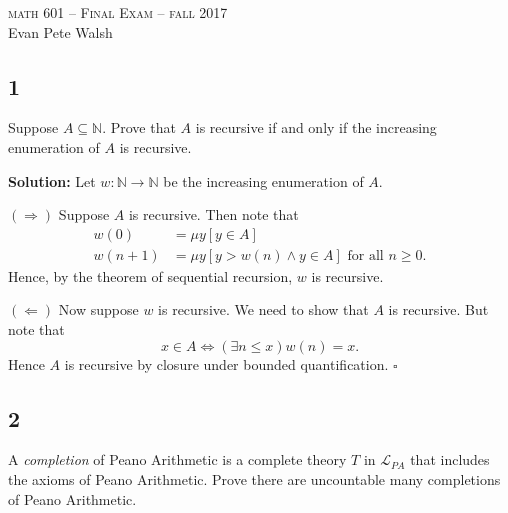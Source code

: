 \documentclass[12pt]{article}
\newcounter{ProofCounter}
\newenvironment{Solution}{\stepcounter{ProofCounter}\textbf{Solution:}}{\hfill$\square$}
\begin{document}
\thispagestyle{empty}
\begin{center}
  \Large \textsc{math 601 -- Final Exam -- fall 2017} \\ 
  \vspace{5mm}
  \large Evan Pete Walsh
\end{center}

\subsection*{1}
\begin{tcolorbox}
  Suppose $A \subseteq \mathbb{N}$. Prove that $A$ is recursive if and only if the increasing enumeration of $A$ is recursive.
\end{tcolorbox}

\begin{Solution}
  Let $w : \mathbb{N} \rightarrow \mathbb{N}$ be the increasing enumeration of $A$.

  $(\Rightarrow)$ Suppose $A$ is recursive. Then note that 
  \begin{align*}
    w(0) & = \mu y [ y \in A ] \\
    w(n + 1) & = \mu y [ y > w(n) \wedge y \in A ] \text{ for all } n \geq 0.
  \end{align*}
  Hence, by the theorem of sequential recursion, $w$ is recursive.

  $(\Leftarrow)$ Now suppose $w$ is recursive. We need to show that $A$ is recursive. But note that 
  \[ x \in A \Leftrightarrow (\exists n \leq x) w(n) = x. \]
  Hence $A$ is recursive by closure under bounded quantification.
\end{Solution}


\newpage
\subsection*{2}
\begin{tcolorbox}
  A \emph{completion} of Peano Arithmetic is a complete theory $T$ in $\mathcal{L}_{PA}$ that includes the axioms of Peano Arithmetic. Prove there are
  uncountable many completions of Peano Arithmetic.
\end{tcolorbox}
\end{document}
